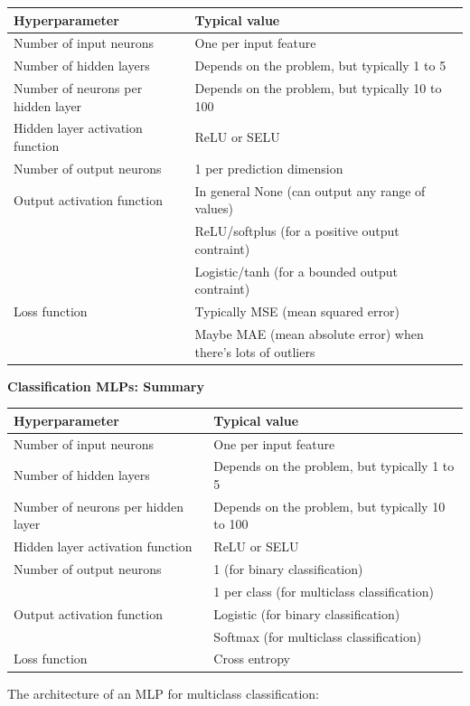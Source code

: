 \begin{tabular}{ |l|l| } 
\hline
Hyperparameter & Typical value \\ 
\hline
Number of input neurons & One per input feature \\ 
Number of hidden layers & Depends on the problem, but typically 1 to 5\\ 
Number of neurons per hidden layer & Depends on the problem, but typically 10 to 100\\ 
Hidden layer activation function & ReLU or SELU\\
Number of output neurons & 1 per prediction dimension\\
Output activation function & In general None (can output any range of values)\\
 & ReLU/softplus (for a positive output contraint)\\
 & Logistic/tanh (for a bounded output contraint)\\
Loss function & Typically MSE (mean squared error)\\
 & Maybe MAE (mean absolute error) when there's lots of outliers\\
\hline
\end{tabular}

\textbf{Classification MLPs: Summary}

\begin{tabular}{ |l|l| } 
\hline
Hyperparameter & Typical value \\ 
\hline
Number of input neurons & One per input feature \\ 
Number of hidden layers & Depends on the problem, but typically 1 to 5\\ 
Number of neurons per hidden layer & Depends on the problem, but typically 10 to 100\\ 
Hidden layer activation function & ReLU or SELU\\
Number of output neurons & 1 (for binary classification)\\
 & 1 per class (for multiclass classification)\\
Output activation function & Logistic (for binary classification)\\
 & Softmax (for multiclass classification)\\
Loss function & Cross entropy\\
\hline
\end{tabular}

\newpage
The architecture of an MLP for multiclass classification:


